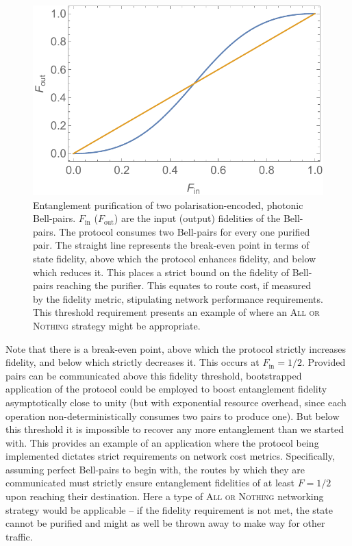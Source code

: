 \documentclass[aps,rmp,twocolumn,amsmath,amssymb,nofootinbib,superscriptaddress,longbibliography,floatfix,table-of-contents,eqsecnum]{revtex4-1}
\begin{document}
\begin{figure}[!htb]
\includegraphics[width=\columnwidth]{ent_purif}
\caption{Entanglement purification of two polarisation-encoded, photonic Bell-pairs. $F_\text{in}$ ($F_\text{out}$) are the input (output) fidelities of the Bell-pairs. The protocol consumes two Bell-pairs for every one purified pair. The straight line represents the break-even point in terms of state fidelity, above which the protocol enhances fidelity, and below which reduces it. This places a strict bound on the fidelity of Bell-pairs reaching the purifier. This equates to route cost, if measured by the fidelity metric, stipulating network performance requirements. This threshold requirement presents an example of where an \textsc{All or Nothing} strategy might be appropriate.} \label{fig:ent_purif}
\end{figure}

Note that there is a break-even point, above which the protocol strictly increases fidelity, and below which strictly decreases it. This occurs at \mbox{$F_\text{in}=1/2$}. Provided pairs can be communicated above this fidelity threshold, bootstrapped application of the protocol could be employed to boost entanglement fidelity asymptotically close to unity (but with exponential resource overhead, since each operation non-deterministically consumes two pairs to produce one). But below this threshold it is impossible to recover any more entanglement than we started with. This provides an example of an application where the protocol being implemented dictates strict requirements on network cost metrics. Specifically, assuming perfect Bell-pairs to begin with, the routes by which they are communicated must strictly ensure entanglement fidelities of at least \mbox{$F=1/2$} upon reaching their destination. Here a type of \textsc{All or Nothing} networking strategy would be applicable -- if the fidelity requirement is not met, the state cannot be purified and might as well be thrown away to make way for other traffic.
\end{document}
